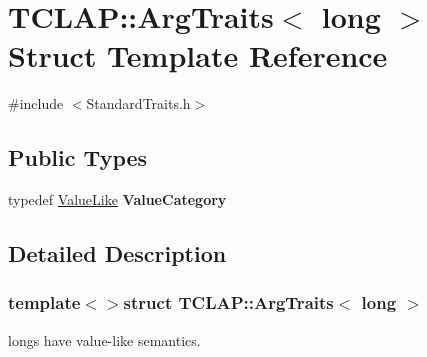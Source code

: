 \hypertarget{struct_t_c_l_a_p_1_1_arg_traits_3_01long_01_4}{\section{T\+C\+L\+A\+P\+:\+:Arg\+Traits$<$ long $>$ Struct Template Reference}
\label{struct_t_c_l_a_p_1_1_arg_traits_3_01long_01_4}
}


{\ttfamily \#include $<$Standard\+Traits.\+h$>$}

\subsection*{Public Types}
\begin{DoxyCompactItemize}
\item 
\hypertarget{struct_t_c_l_a_p_1_1_arg_traits_3_01long_01_4_a942d9a1e813bc3f82b51a2dcedb7316d}{typedef \hyperlink{struct_t_c_l_a_p_1_1_value_like}{Value\+Like} {\bfseries Value\+Category}}\label{struct_t_c_l_a_p_1_1_arg_traits_3_01long_01_4_a942d9a1e813bc3f82b51a2dcedb7316d}

\end{DoxyCompactItemize}


\subsection{Detailed Description}
\subsubsection*{template$<$$>$struct T\+C\+L\+A\+P\+::\+Arg\+Traits$<$ long $>$}

longs have value-\/like semantics. 